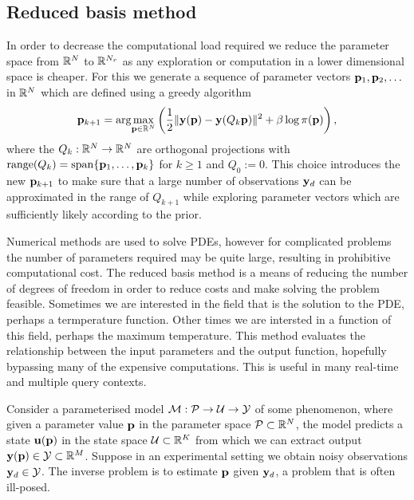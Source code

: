 \subsection{Reduced basis method}

In order to decrease the computational load required we reduce the parameter space from ${\mathbb R}^N$ to ${\mathbb R}^{N_r}$ as any exploration or computation in a lower dimensional space is cheaper. 
For this we generate a sequence of parameter vectors ${\mathbf{p}}_1, {\mathbf{p}}_2,\ldots$ in ${\mathbb R}^N$ which are defined using a greedy algorithm %
\begin{equation}\label{eq:greedyOpt}
{\mathbf{p}}_{k+1} = \arg\!\max_{{\mathbf{p}}\in{\mathbb R}^N} \left(\frac{1}{2}\|{\mathbf{y}}({\mathbf{p}})-{\mathbf{y}}(Q_k {\mathbf{p}})\|^2 + \beta \log \pi({\mathbf{p}})\right),
\end{equation}
where the $Q_k:{\mathbb R}^N\rightarrow {\mathbb R}^N$ are orthogonal projections with 
$\operatorname{range}(Q_k)=\operatorname{span}\{{\mathbf{p}}_1,\ldots,{\mathbf{p}}_k\}$ for $k\geq 1$ and $Q_0:=0$. 
This choice introduces the new ${\mathbf{p}}_{k+1}$ to make sure that a large number of observations ${\mathbf{y}}_d$ can be approximated in the range of $Q_{k+1}$ while exploring parameter vectors which are sufficiently likely according to the prior.


Numerical methods are used to solve PDEs, however for complicated problems the number of parameters required may be quite large, resulting in prohibitive computational cost. The reduced basis method is a means of reducing the number of degrees of freedom in order to reduce costs and make solving the problem feasible. Sometimes we are interested in the field that is the solution to the PDE, perhaps a termperature function. Other times we are intersted in a function of this field, perhaps the maximum temperature. This method evaluates the relationship between the input parameters and the output function, hopefully bypassing many of the expensive computations. This is useful in many real-time and multiple query contexts.

Consider a parameterised model $\mathcal{M}:\mathcal{P} \rightarrow \mathcal{U} \rightarrow \mathcal{Y}$ of some phenomenon, where given a parameter value $\mathbf{p}$ in the parameter space $\mathcal{P}\subset{\mathbb R}^N$, the model predicts a state ${\mathbf{u}}({\mathbf{p}})$ in the state space $\mathcal{U}\subset{\mathbb R}^K$ from which we can extract output  $\mathbf{y}(\mathbf{p})\in \mathcal{Y}\subset{\mathbb R}^M$. Suppose in an experimental setting we obtain noisy observations $\mathbf{y}_d\in \mathcal{Y}$. The inverse problem is to estimate $\mathbf{p}$ given $\mathbf{y}_d$, a problem that is often ill-posed. 

